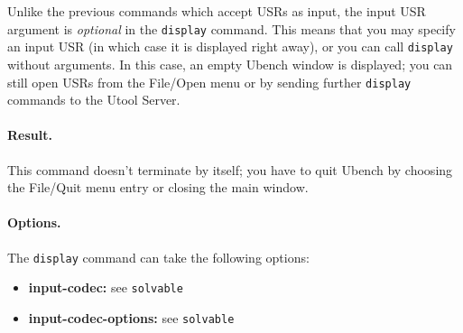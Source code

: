 Unlike the previous commands which accept USRs as input, the input USR
argument is \emph{optional} in the \verb?display? command. This means
that you may specify an input USR (in which case it is displayed right
away), or you can call \verb?display? without arguments. In this case,
an empty Ubench window is displayed; you can still open USRs from the
File/Open menu or by sending further \verb?display? commands to the
Utool Server.


\paragraph{Result.} This command doesn't terminate by itself; you have
to quit Ubench by choosing the File/Quit menu entry or closing the main window.

\paragraph{Options.} The \verb?display? command can take the following
options:

\begin{itemize}
\item \textbf{input-codec:} see \verb?solvable?
\item \textbf{input-codec-options:} see \verb?solvable?
\end{itemize}







